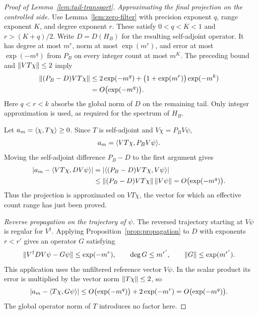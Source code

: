 \begin{proof}[Proof of Lemma~\ref{lem:tail-transport}]
\emph{Approximating the final projection on the controlled side.}
Use Lemma~\ref{lem:zero-filter} with precision exponent $q$, range
exponent $K$, and degree exponent $r$.  These satisfy $0<q<K<1$
and $r>(K+q)/2$.  Write $D=D(H_B)$ for the resulting self-adjoint
operator.  It has degree at most $m^r$, norm at most $\exp(m^r)$,
and error at most $\exp(-m^q)$ from $P_B$ on every integer count
at most $m^K$.  The preceding bound and $\lVert VT\chi\rVert\le2$ imply
\begin{align*}
 \lVert(P_B-D)VT\chi\rVert
 &\le 2\exp(-m^q)
       +\bigl(1+\exp(m^r)\bigr)\exp(-m^k)\\
 &=O\bigl(\exp(-m^q)\bigr).
\end{align*}
Here $q<r<k$ absorbs the global norm of $D$ on the remaining tail.
Only integer approximation is used, as required for the spectrum of
$H_B$.

Let $a_m=\langle \chi,T\chi\rangle\ge0$.  Since $T$ is self-adjoint and
$V\chi=P_BV\psi$,
\[
 a_m=\langle VT\chi,P_BV\psi\rangle.
\]
Moving the self-adjoint difference $P_B-D$ to the first argument
gives
\begin{align*}
 \lvert a_m-\langle VT\chi,DV\psi\rangle\rvert
 &=\lvert\langle (P_B-D)VT\chi,V\psi\rangle\rvert\\
 &\le\lVert(P_B-D)VT\chi\rVert\,\lVert V\psi\rVert
 =O\bigl(\exp(-m^q)\bigr).
\end{align*}
Thus the projection is approximated on $VT\chi$, the vector for which
an effective count range has just been proved.

\emph{Reverse propagation on the trajectory of $\psi$.}
The reversed trajectory starting at $V\psi$ is regular for
$V^\dagger$.  Applying Proposition~\ref{prop:propagation} to $D$
with exponents $r<r'$ gives an operator $G$ satisfying
\[
 \lVert V^\dagger DV\psi-G\psi\rVert\le\exp(-m^r),
 \qquad \deg G\le m^{r'},
 \qquad \lVert G\rVert\le\exp(m^{r'}).
\]
This application uses the unfiltered reference vector $V\psi$.
In the scalar product its error is multiplied by the vector norm
$\lVert T\chi\rVert\le2$, so
\[
 \lvert a_m-\langle T\chi,G\psi\rangle\rvert
 \le O\bigl(\exp(-m^q)\bigr)+2\exp(-m^r)
 =O\bigl(\exp(-m^q)\bigr).
\]
The global operator norm of $T$ introduces no factor here.


\end{proof}
